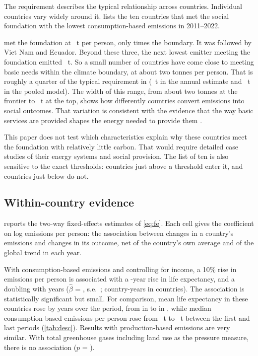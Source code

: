 The requirement describes the typical relationship across countries. Individual countries vary widely around it.  lists the ten countries that met the social foundation with the lowest consumption-based emissions in 2011--2022.



\nFrontierMinCountry{} met the foundation at \nFrontierMin~t per person, only \nFrontierMinMultiple{} times the boundary. It was followed by Viet Nam and Ecuador. Beyond these three, the next lowest emitter meeting the foundation emitted \nFrontierFourth~t. So a small number of countries have come close to meeting basic needs within the climate boundary, at about two tonnes per person. That is roughly a quarter of the typical requirement in \nLastYear{} (\nReqAnnualEnd~t in the annual estimate and \nReqEnd~t in the pooled model). The width of this range, from about two tonnes at the frontier to \nMetMaxCons~t at the top, shows how differently countries convert emissions into social outcomes. That variation is consistent with the evidence that the way basic services are provided shapes the energy needed to provide them \citep{vogel2021}.

This paper does not test which characteristics explain why these countries meet the foundation with relatively little carbon. That would require detailed case studies of their energy systems and social provision. The list of ten is also sensitive to the exact thresholds: countries just above a threshold enter it, and countries just below do not.

\subsection{Within-country evidence}\label{sec:res-within}

 reports the two-way fixed-effects estimates of \cref{eq:fe}. Each cell gives the coefficient on log emissions per person: the association between changes in a country's emissions and changes in its outcome, net of the country's own average and of the global trend in each year.



With consumption-based emissions and controlling for income, a 10\% rise in emissions per person is associated with a \nFeLETen-year rise in life expectancy, and a doubling with \nFeLEDouble{} years ($\hat\beta$ = \nFeLE, s.e.\ \nFeLESe; \nFeN{} country-years in \nFeCountries{} countries). The association is statistically significant but small. For comparison, mean life expectancy in these countries rose by \nLeGain{} years over the period, from \nLeStart{} in \nShareYearStart{} to \nLeEnd{} in \nLastYear{}, while median consumption-based emissions per person rose from \nDescCOFirst~t to \nDescCOLast~t between the first and last periods (\cref{tab:desc}). Results with production-based emissions are very similar. With total greenhouse gases including land use as the pressure measure, there is no association ($p$ = \nFeGhgP).

